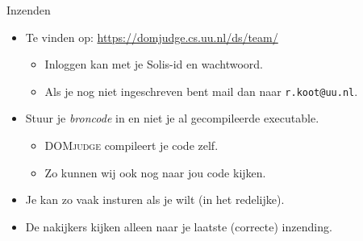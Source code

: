 \documentclass[serif,professionalfont]{beamer}
\newcommand{\DOMjudge}{\textsc{DOMjudge}\xspace}
\begin{document}
\begin{frame}{Inzenden}

    \begin{itemize}

        \item Te vinden op: \url{https://domjudge.cs.uu.nl/ds/team/}
        
            \begin{itemize}
            
                \item Inloggen kan met je Solis-id en wachtwoord.
                
                \item Als je nog niet ingeschreven bent mail dan naar \texttt{r.koot@uu.nl}.

            \end{itemize}
        
        \item Stuur je \emph{broncode} in en niet je al gecompileerde executable.
        
            \begin{itemize}
            
                \item \DOMjudge compileert je code zelf.
                
                \item Zo kunnen wij ook nog naar jou code kijken.
            
            \end{itemize}
        
        \item Je kan zo vaak insturen als je wilt (in het redelijke).
        
        \item De nakijkers kijken alleen naar je laatste (correcte) inzending.
        
    \end{itemize}

\end{frame}
\end{document}
